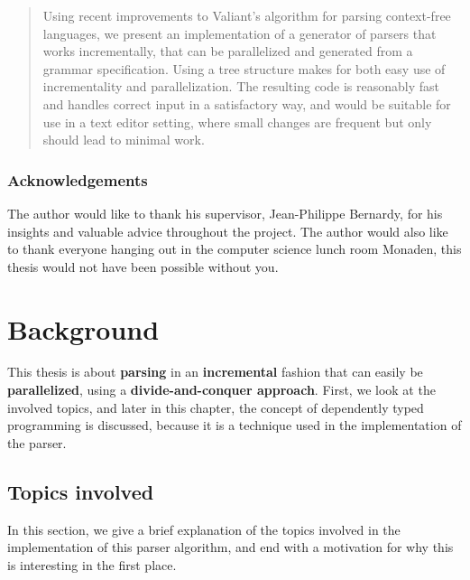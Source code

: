 \documentclass[a4paper,12pt,notitlepage]{report}
\begin{document}


\begin{abstract}
\thispagestyle{plain}
\setcounter{page}{3} %
\noindent Using recent improvements to Valiant's algorithm for parsing context-free
languages, we present an implementation of a generator of parsers that works
incrementally, that can be parallelized and generated from a grammar
specification. Using a tree structure makes for both easy use of incrementality
and parallelization.  The resulting code is reasonably fast and handles correct
input in a satisfactory way, and would be suitable for use in a text editor
setting, where small changes are frequent but only should lead to minimal work.
\end{abstract}
\newpage

\thispagestyle{plain}
\subsection*{Acknowledgements}
The author would like to thank his supervisor, Jean-Philippe Bernardy, for his
insights and valuable advice throughout the project. The author would also like
to thank everyone hanging out in the computer science lunch room Monaden, this
thesis would not have been possible without you. 

\newpage
{}
\tableofcontents

%
%

\chapter{Background}
This thesis is about \textbf{parsing} in an \textbf{incremental} fashion that
can easily be \textbf{parallelized}, using a \textbf{divide-and-conquer
approach}. First, we look at the involved topics, and later in this chapter, the
concept of dependently typed programming is discussed, because it is a technique
used in the implementation of the parser.

\section{Topics involved}
In this section, we give a brief explanation of the topics involved in the
implementation of this parser algorithm, and end with a motivation for why this
is interesting in the first place. 
\end{document}
